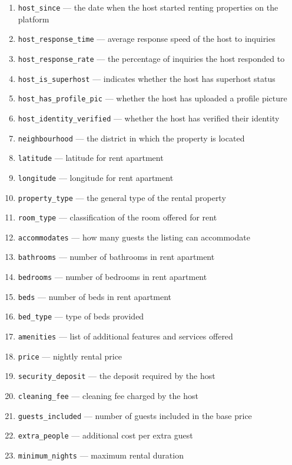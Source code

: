 \begin{enumerate}
  \item \texttt{host\_since} --- the date when the host started renting properties on the platform
  \item \texttt{host\_response\_time} --- average response speed of the host to inquiries
  \item \texttt{host\_response\_rate} --- the percentage of inquiries the host responded to
  \item \texttt{host\_is\_superhost} --- indicates whether the host has superhost status
  \item \texttt{host\_has\_profile\_pic} --- whether the host has uploaded a profile picture
  \item \texttt{host\_identity\_verified} --- whether the host has verified their identity
  \item \texttt{neighbourhood} --- the district in which the property is located
  \item \texttt{latitude} --- latitude for rent apartment
  \item \texttt{longitude} --- longitude for rent apartment
  \item \texttt{property\_type} --- the general type of the rental property
  \item \texttt{room\_type} --- classification of the room offered for rent
  \item \texttt{accommodates} --- how many guests the listing can accommodate
  \item \texttt{bathrooms} --- number of bathrooms in rent apartment
  \item \texttt{bedrooms} --- number of bedrooms in rent apartment
  \item \texttt{beds} --- number of beds in rent apartment
  \item \texttt{bed\_type} --- type of beds provided
  \item \texttt{amenities} --- list of additional features and services offered
  \item \texttt{price} --- nightly rental price
  \item \texttt{security\_deposit} --- the deposit required by the host
  \item \texttt{cleaning\_fee} --- cleaning fee charged by the host
  \item \texttt{guests\_included} --- number of guests included in the base price
  \item \texttt{extra\_people} --- additional cost per extra guest
  \item \texttt{minimum\_nights} --- maximum rental duration

\end{enumerate}
